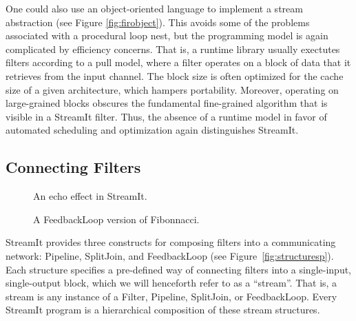 One could also use an object-oriented language to implement a stream
abstraction (see Figure \ref{fig:firobject}).  This avoids some of the
problems associated with a procedural loop nest, but the programming
model is again complicated by efficiency concerns.  That is, a runtime
library usually exectutes filters according to a pull model, where a
filter operates on a block of data that it retrieves from the input
channel.  The block size is often optimized for the cache size of a
given architecture, which hampers portability.  Moreover, operating on
large-grained blocks obscures the fundamental fine-grained algorithm
that is visible in a StreamIt filter.  Thus, the absence of a runtime
model in favor of automated scheduling and optimization again
distinguishes StreamIt.

\subsection{Connecting Filters}
\label{sec:connecting}

\begin{figure}[t]
\begin{minipage}{2.175in}
\vspace{-18pt}
\caption{\protect\small An echo effect in StreamIt.
\protect\label{fig:echo}}
\end{minipage}
\hspace{0.2in}
\begin{minipage}{2.4in}
\vspace{-18pt}
\caption{\protect\small A FeedbackLoop version of Fibonnacci.
\protect\label{fig:feed}}
\end{minipage}
\vspace{-12pt}
\end{figure}

StreamIt provides three constructs for composing filters into a
communicating network: Pipeline, SplitJoin, and FeedbackLoop (see
Figure~\ref{fig:structuresp}).  Each structure specifies a pre-defined
way of connecting filters into a single-input, single-output block,
which we will henceforth refer to as a ``stream''.  That is, a stream
is any instance of a Filter, Pipeline, SplitJoin, or FeedbackLoop.
Every StreamIt program is a hierarchical composition of these stream
structures.

